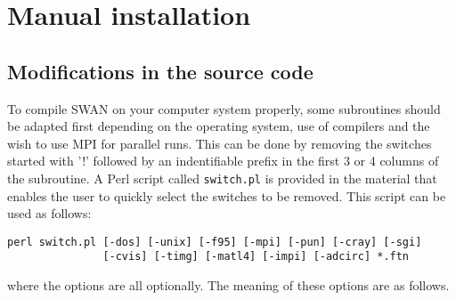 \documentclass[12pt]{book}
\begin{document}
\section{Manual installation} \label{sec:manual}

\subsection{Modifications in the source code}

To compile SWAN on your computer system properly, some subroutines should be adapted first
depending on the operating system, use of compilers and the wish to use MPI for
parallel runs. This can be done by removing the switches started with '!' followed by an
indentifiable prefix in the first 3 or 4 columns of the subroutine. A Perl script called
{\tt switch.pl} is provided in the material that enables the user to quickly select the
switches to be removed. This script can be used as follows:
\begin{verbatim}
perl switch.pl [-dos] [-unix] [-f95] [-mpi] [-pun] [-cray] [-sgi]
               [-cvis] [-timg] [-matl4] [-impi] [-adcirc] *.ftn
\end{verbatim}
where the options are all optionally. The meaning of these options are as follows.
\end{document}
